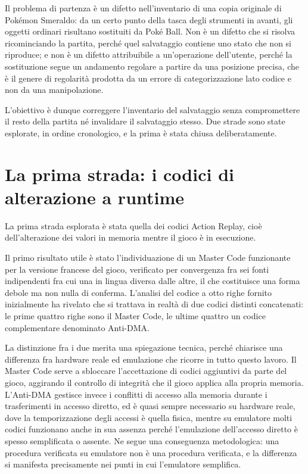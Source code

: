 Il problema di partenza è un difetto nell'inventario di una copia originale di Pokémon Smeraldo: da un certo punto della tasca degli strumenti in avanti, gli oggetti ordinari risultano sostituiti da Poké Ball. Non è un difetto che si risolva ricominciando la partita, perché quel salvataggio contiene uno stato che non si riproduce; e non è un difetto attribuibile a un'operazione dell'utente, perché la sostituzione segue un andamento regolare a partire da una posizione precisa, che è il genere di regolarità prodotta da un errore di categorizzazione lato codice e non da una manipolazione.

L'obiettivo è dunque correggere l'inventario del salvataggio senza compromettere il resto della partita né invalidare il salvataggio stesso. Due strade sono state esplorate, in ordine cronologico, e la prima è stata chiusa deliberatamente.

\section{La prima strada: i codici di alterazione a runtime}

La prima strada esplorata è stata quella dei codici Action Replay, cioè dell'alterazione dei valori in memoria mentre il gioco è in esecuzione.

Il primo risultato utile è stato l'individuazione di un Master Code funzionante per la versione francese del gioco, verificato per convergenza fra sei fonti indipendenti fra cui una in lingua diversa dalle altre, il che costituisce una forma debole ma non nulla di conferma. L'analisi del codice a otto righe fornito inizialmente ha rivelato che si trattava in realtà di due codici distinti concatenati: le prime quattro righe sono il Master Code, le ultime quattro un codice complementare denominato Anti-DMA.

La distinzione fra i due merita una spiegazione tecnica, perché chiarisce una differenza fra hardware reale ed emulazione che ricorre in tutto questo lavoro. Il Master Code serve a sbloccare l'accettazione di codici aggiuntivi da parte del gioco, aggirando il controllo di integrità che il gioco applica alla propria memoria. L'Anti-DMA gestisce invece i conflitti di accesso alla memoria durante i trasferimenti in accesso diretto, ed è quasi sempre necessario su hardware reale, dove la temporizzazione degli accessi è quella fisica, mentre su emulatore molti codici funzionano anche in sua assenza perché l'emulazione dell'accesso diretto è spesso semplificata o assente. Ne segue una conseguenza metodologica: una procedura verificata su emulatore non è una procedura verificata, e la differenza si manifesta precisamente nei punti in cui l'emulatore semplifica.


